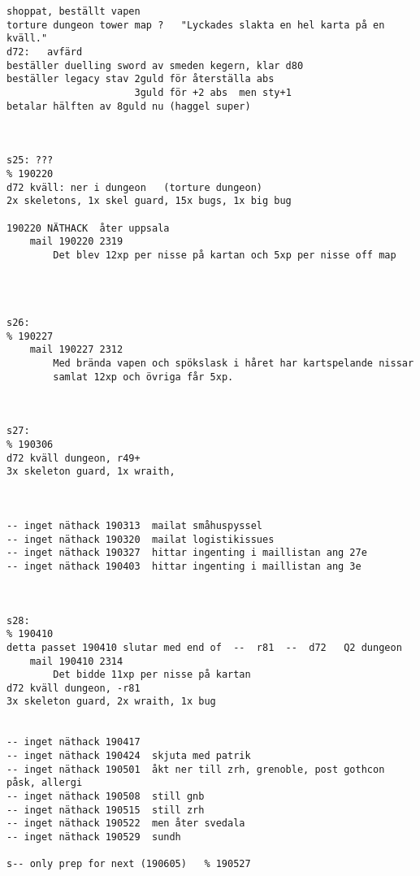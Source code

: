 \begin{verbatim}
shoppat, beställt vapen
torture dungeon tower map ?   "Lyckades slakta en hel karta på en kväll."
d72:   avfärd
beställer duelling sword av smeden kegern, klar d80
beställer legacy stav 2guld för återställa abs
                      3guld för +2 abs  men sty+1
betalar hälften av 8guld nu (haggel super)



s25: ???                                                                % 190220
d72 kväll: ner i dungeon   (torture dungeon)
2x skeletons, 1x skel guard, 15x bugs, 1x big bug

190220 NÄTHACK  åter uppsala
    mail 190220 2319
        Det blev 12xp per nisse på kartan och 5xp per nisse off map




s26:                                                                    % 190227
    mail 190227 2312
        Med brända vapen och spökslask i håret har kartspelande nissar 
        samlat 12xp och övriga får 5xp.



s27:                                                                    % 190306
d72 kväll dungeon, r49+
3x skeleton guard, 1x wraith, 



-- inget näthack 190313  mailat småhuspyssel
-- inget näthack 190320  mailat logistikissues 
-- inget näthack 190327  hittar ingenting i maillistan ang 27e
-- inget näthack 190403  hittar ingenting i maillistan ang 3e



s28:                                                                    % 190410
detta passet 190410 slutar med end of  --  r81  --  d72   Q2 dungeon
    mail 190410 2314    
        Det bidde 11xp per nisse på kartan
d72 kväll dungeon, -r81
3x skeleton guard, 2x wraith, 1x bug


-- inget näthack 190417
-- inget näthack 190424  skjuta med patrik
-- inget näthack 190501  åkt ner till zrh, grenoble, post gothcon påsk, allergi
-- inget näthack 190508  still gnb
-- inget näthack 190515  still zrh
-- inget näthack 190522  men åter svedala
-- inget näthack 190529  sundh

s-- only prep for next (190605)   % 190527



\end{verbatim}
